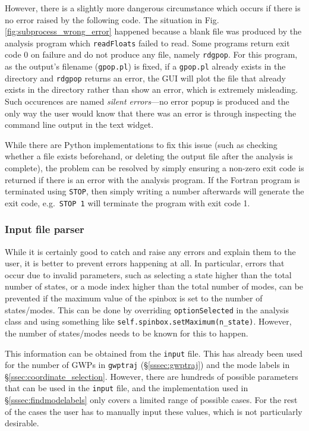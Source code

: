 \documentclass[12pt]{article}
\begin{document}
However, there is a slightly more dangerous circumstance which occurs if there is no error raised by the following code. The situation in Fig. \ref{fig:subprocess_wrong_error} happened because a blank file was produced by the analysis program which \texttt{readFloats} failed to read. Some programs return exit code 0 on failure and do not produce any file, namely \texttt{rdgpop}. For this program, as the output's filename (\texttt{gpop.pl}) is fixed, if a \texttt{gpop.pl} already exists in the directory and \texttt{rdgpop} returns an error, the GUI will plot the file that already exists in the directory rather than show an error, which is extremely misleading. Such occurences are named \textit{silent errors}---no error popup is produced and the only way the user would know that there was an error is through inspecting the command line output in the text widget.

While there are Python implementations to fix this issue (such as checking whether a file exists beforehand, or deleting the output file after the analysis is complete), the problem can be resolved by simply ensuring a non-zero exit code is returned if there is an error with the analysis program. If the Fortran program is terminated using \texttt{STOP}, then simply writing a number afterwards will generate the exit code, e.g.~\texttt{STOP 1} will terminate the program with exit code 1.

\subsubsection{Input file parser}\label{sssec:input_parser}

While it is certainly good to catch and raise any errors and explain them to the user, it is better to prevent errors happening at all. In particular, errors that occur due to invalid parameters, such as selecting a state higher than the total number of states, or a mode index higher than the total number of modes, can be prevented if the maximum value of the spinbox is set to the number of states/modes. This can be done by overriding \texttt{optionSelected} in the analysis class and using something like \texttt{self.spinbox.setMaximum(n_state)}. However, the number of states/modes needs to be known for this to happen.

This information can be obtained from the \texttt{input} file. This has already been used for the number of GWPs in \texttt{gwptraj} (\S\ref{sssec:gwptraj}) and the mode labels in \S\ref{ssec:coordinate_selection}. However, there are hundreds of possible parameters that can be used in the \texttt{input} file, and the implementation used in \S\ref{sssec:findmodelabels} only covers a limited range of possible cases. For the rest of the cases the user has to manually input these values, which is not particularly desirable.
\end{document}
